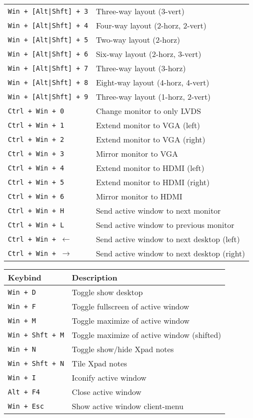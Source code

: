 \documentclass[letterpaper,12pt]{article}
\begin{document}
\begin{table}[H]
\begin{tabular}{|C{5cm}|L{10cm}|}
    {\tt Win + [Alt|Shft] + 3} & Three-way layout (3-vert) \\
    {\tt Win + [Alt|Shft] + 4} & Four-way layout (2-horz, 2-vert) \\
    {\tt Win + [Alt|Shft] + 5} & Two-way layout (2-horz) \\
    {\tt Win + [Alt|Shft] + 6} & Six-way layout (2-horz, 3-vert) \\
    {\tt Win + [Alt|Shft] + 7} & Three-way layout (3-horz) \\
    {\tt Win + [Alt|Shft] + 8} & Eight-way layout (4-horz, 4-vert) \\
    {\tt Win + [Alt|Shft] + 9} & Three-way layout (1-horz, 2-vert) \\
    \hline
    {\tt Ctrl + Win + 0} & Change monitor to only LVDS \\
    {\tt Ctrl + Win + 1} & Extend monitor to VGA (left) \\
    {\tt Ctrl + Win + 2} & Extend monitor to VGA (right) \\
    {\tt Ctrl + Win + 3} & Mirror monitor to VGA \\
    {\tt Ctrl + Win + 4} & Extend monitor to HDMI (left) \\
    {\tt Ctrl + Win + 5} & Extend monitor to HDMI (right) \\
    {\tt Ctrl + Win + 6} & Mirror monitor to HDMI \\
    {\tt Ctrl + Win + H} & Send active window to next monitor \\
    {\tt Ctrl + Win + L} & Send active window to previous monitor \\
    {\tt Ctrl + Win + $\leftarrow$} & Send active window to next desktop (left) \\
    {\tt Ctrl + Win + $\rightarrow$} & Send active window to next desktop (right) \\
    \hline
  \end{tabular}
\end{table}

\begin{table}[H]
  \begin{tabular}{|C{5cm}|L{10cm}|}
    \hline
    \textbf{Keybind} & \textbf{Description} \\
    \hline
    {\tt Win + D} & Toggle show desktop \\
    {\tt Win + F} & Toggle fullscreen of active window \\
    {\tt Win + M} & Toggle maximize of active window \\
    {\tt Win + Shft + M} & Toggle maximize of active window (shifted) \\
    {\tt Win + N} & Toggle show/hide Xpad notes \\
    {\tt Win + Shft + N} & Tile Xpad notes \\
    {\tt Win + I} & Iconify active window \\
    {\tt Alt + F4} & Close active window \\
    {\tt Win + Esc} & Show active window client-menu \\
    \hline
  \end{tabular}
\end{table}
\end{document}
